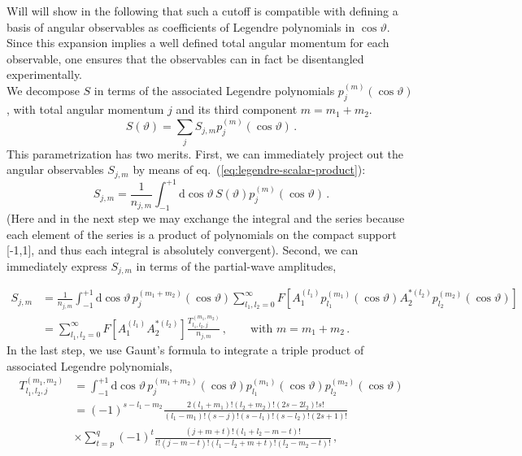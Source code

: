 \documentclass[aps,nofootinbib,preprintnumbers,prd,twocolumn]{revtex4-1}
\newcommand{\refeq}[1]{eq.~(\ref{eq:#1})}
\newcommand{\rmdx}[1]{\mbox{d} #1 \,} %
\renewcommand{\theta}{\vartheta}
\begin{document}
Will will show in the following that such a cutoff is compatible with defining a basis of angular
observables as coefficients of Legendre polynomials in $\cos\theta$. Since this expansion implies
a well defined total angular momentum for each observable, one ensures that the observables can in
fact be disentangled experimentally.\\

We decompose $S$ in terms of the associated Legendre polynomials $p_{j}^{(m)}(\cos\theta)$,
with total angular momentum $j$ and its third component $m=m_1 + m_2$.
\begin{equation}
    S(\theta) = \sum_j S_{j,m} p_{j}^{(m)}(\cos\theta)\,.
\end{equation}
This parametrization has two merits. First, we can immediately project out the angular observables $S_{j,m}$ by means of \refeq{legendre-scalar-product}:
\begin{equation}
    S_{j,m} = \frac{1}{n_{j,m}} \int_{-1}^{+1} \rmdx{\cos\theta} S(\theta) p_{j}^{(m)}(\cos\theta)\,.
\end{equation}
(Here and in the next step we may exchange the integral and the
series because each element of the series is a product of
polynomials on the compact support [-1,1], and thus each integral
is absolutely convergent).
Second, we can immediately express $S_{j,m}$ in terms of
the partial-wave amplitudes,
\begin{widetext}
\begin{equation}
    \label{eq:partial-wave-observable-infinite}
    \begin{aligned}
        S_{j,m}
            & = \frac{1}{n_{j,m}} \int_{-1}^{+1} \rmdx{\cos\theta} p_{j}^{(m_1 + m_2)}(\cos\theta) \sum_{l_1,l_2=0}^\infty F\left[A_{1}^{(l_1)} p_{l_1}^{(m_1)}(\cos\theta) A_{2}^{*(l_2)}p_{l_2}^{(m_2)}(\cos\theta)\right]\\
            & = \sum_{l_1,l_2=0}^\infty F\left[A_{1}^{(l_1)} A_{2}^{*(l_2)}\right] \frac{T_{l_1,l_2,j}^{(m_1,m_2)}}{n_{j,m}}\,,\qquad\text{with }m = m_1 + m_2\,.
    \end{aligned}
\end{equation}
In the last step, we use Gaunt's formula \cite{Gaunt:1929} to integrate a triple product of associated Legendre polynomials,
\begin{equation}
\begin{aligned}
    T_{l_1,l_2,j}^{(m_1,m_2)}
        & = \int_{-1}^{+1} \rmdx{\cos\theta} p_{j}^{(m_1 + m_2)}(\cos\theta) p_{l_1}^{(m_1)}(\cos\theta) p_{l_2}^{(m_2)}(\cos\theta)\\
        & = (-1)^{s - l_1 - m_2} \frac{2 (l_1 + m_1)! (l_2 + m_2)! (2s - 2 l_2)! s!}{(l_1 - m_1)! (s - j)! (s - l_1)! (s - l_2)! (2s + 1)!}\\
        & \times \sum_{t=p}^q (-1)^t \frac{(j + m + t)!(l_1 + l_2 - m - t)!}{t! (j - m - t)! (l_1 - l_2 + m + t)! (l_2 - m_2 - t)!}\,,
\end{aligned}
\end{equation}
\end{widetext}
\end{document}
